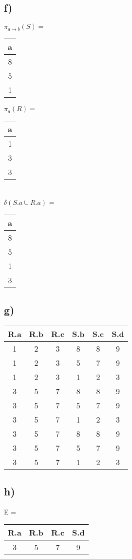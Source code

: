 \documentclass{article}
\begin{document}
	\subsection*{f)}
	$\pi_{a \to b}(S) =$
	\begin{tabular}{c}
		a \\
		\hline
		8 \\
		5 \\
		1 \\
	\end{tabular}
	$\pi_{a}(R) = $
	\begin{tabular}{c}
		a \\
		\hline
		1 \\
		3 \\
		3 \\
	\end{tabular} \\
	$\delta(S.a \cup R.a)$ = 
	\begin{tabular}{c}
		a \\
		\hline
		8 \\
		5 \\
		1 \\
		3
	\end{tabular}
	\subsection*{g)}
	\begin{tabular}{c|c|c|c|c|c}
		R.a & R.b & R.c & S.b & S.c & S.d \\
		\hline
		\hline
		1 & 2 & 3 & 8 & 8 & 9 \\
		\hline
		1 & 2 & 3 & 5 & 7 & 9 \\
		\hline
		1 & 2 & 3 & 1 & 2 & 3 \\
		\hline
		3 & 5 & 7 & 8 & 8 & 9 \\
		\hline
		3 & 5 & 7 & 5 & 7 & 9 \\
		\hline
		3 & 5 & 7 & 1 & 2 & 3 \\
		\hline
		3 & 5 & 7 & 8 & 8 & 9 \\
		\hline
		3 & 5 & 7 & 5 & 7 & 9 \\
		\hline
		3 & 5 & 7 & 1 & 2 & 3 \\
	\end{tabular}
	\subsection*{h)}
	E = 
	\begin{tabular}{c|c|c|c|}
		R.a & R.b & R.c &  S.d \\
		\hline
		\hline
		3 & 5 & 7 & 9
	\end{tabular}
\end{document}
